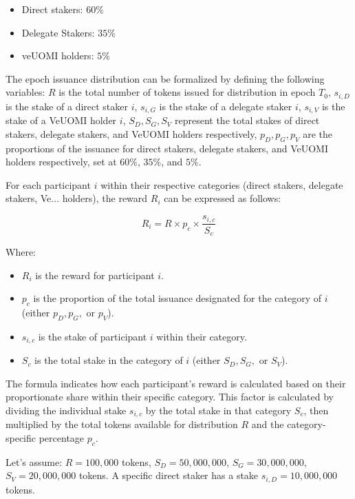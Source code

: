 \documentclass{article}
\begin{document}
\begin{itemize}
\item Direct stakers: \(60\% \)
\item Delegate Stakers: \(35\% \)
\item veUOMI holders: \(5\% \)
\end{itemize}

The epoch issuance distribution can be formalized by defining the following variables: 
\( R \) is the total number of tokens issued for distribution in epoch \( T_0 \),
\( s_{i,D} \) is the stake of a direct staker \( i \),
\( s_{i,G} \) is the stake of a delegate staker \( i \),
\( s_{i,V} \) is the stake of a VeUOMI holder \( i \),
\( S_D, S_G, S_V \) represent the total stakes of direct stakers, delegate stakers, and VeUOMI holders respectively,
\( p_D, p_G, p_V \) are the proportions of the issuance for direct stakers, delegate stakers, and VeUOMI holders respectively, set at \(60\%\), \(35\%\), and \(5\%\).


For each participant \( i \) within their respective categories (direct stakers, delegate stakers, Ve... holders), the reward \( R_i \) can be expressed as follows:

\[ R_i = R \times p_c \times \frac{s_{i,c}}{S_c} \]

Where:
\begin{itemize}
\item \( R_i \) is the reward for participant \( i \).
\item \( p_c \) is the proportion of the total issuance designated for the category of \( i \) (either \( p_D, p_G, \) or \( p_V \)).
\item \( s_{i,c} \) is the stake of participant \( i \) within their category.
\item \( S_c \) is the total stake in the category of \( i \) (either \( S_D, S_G, \) or \( S_V \)).
\end{itemize}
The formula indicates how each participant's reward is calculated based on their proportionate share within their specific category. This factor is calculated by dividing the individual stake \( s_{i,c} \) by the total stake in that category \( S_c \), then multiplied by the total tokens available for distribution \( R \) and the category-specific percentage \( p_c \).

Let's assume: \( R = 100,000 \) tokens, \( S_D = 50,000,000 \), \( S_G = 30,000,000 \), \( S_V = 20,000,000 \) tokens. A specific direct staker has a stake \( s_{i,D} = 10,000,000 \) tokens.
\end{document}
